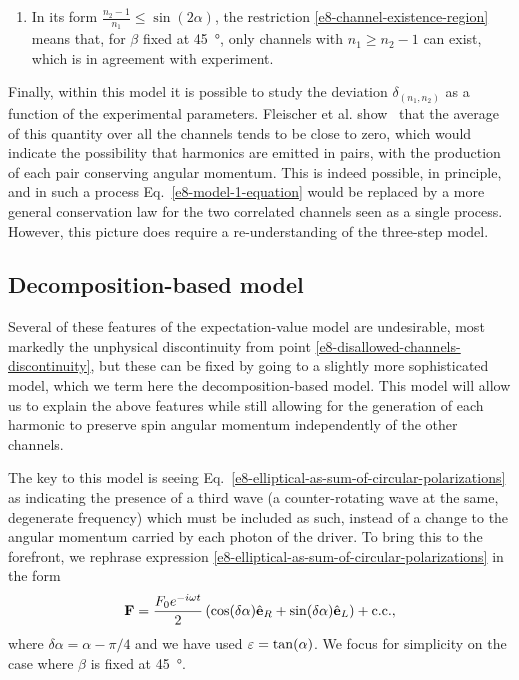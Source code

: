 \begin{enumerate}[label=(\roman*)]
 \item
 In its form $\frac{n_2-1}{n_1}\leq\sin(2\alpha)$, the restriction \eqref{e8-channel-existence-region} means that, for $\beta$ fixed at \SI{45}{\degree}, only channels with $n_1\geq n_2-1$ can exist, which is in agreement with experiment.

\end{enumerate}


Finally, within this model it is possible to study the deviation $\delta_{(n_1,n_2)}$ as a function of the experimental parameters. Fleischer et al. show~\cite{fleischer_spin_2014} that the average of this quantity over all the channels tends to be close to zero, which would indicate the possibility that harmonics are emitted in pairs, with the production of each pair conserving angular momentum. This is indeed possible, in principle, and in such a process Eq.~\eqref{e8-model-1-equation} would be replaced by a more general conservation law for the two correlated channels seen as a single process. However, this picture does require a re-understanding of the three-step model.





\subsection{Decomposition-based model}
\label{sec:decomposition-based-model}

Several of these features of the expectation-value model are undesirable, most markedly the unphysical discontinuity from point \ref{e8-disallowed-channels-discontinuity}, but these can be fixed by going to a slightly more sophisticated model, which we term here the decomposition-based model. This model will allow us to explain the above features while still allowing for the generation of each harmonic to preserve spin angular momentum independently of the other channels.


The key to this model is seeing Eq.~\eqref{e8-elliptical-as-sum-of-circular-polarizations} as indicating the presence of a third wave (a counter-rotating wave at the same, degenerate frequency) which must be included as such, instead of a change to the angular momentum carried by each photon of the driver. To bring this to the forefront, we rephrase expression \eqref{e8-elliptical-as-sum-of-circular-polarizations} in the form
\begin{equation}
 \vb{F}=
 \frac{F_0e^{-i\omega t}}{2}
 \left(
 \cos(\delta\alpha)\hat{\vb{e}}_R
 +
  \sin(\delta\alpha)\hat{\vb{e}}_L
 \right)
 +\mathrm{c.c.},
 \label{e8-elliptical-as-two-fields}
\end{equation}
where $\delta\alpha=\alpha-\pi/4$ and we have used $\varepsilon=\tan(\alpha)$. We focus for simplicity on the case where $\beta$ is fixed at \SI{45}{\degree}.


